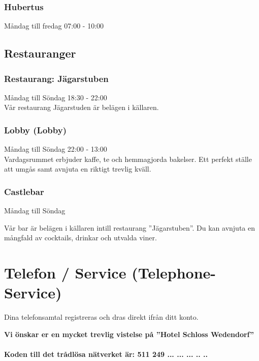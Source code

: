 \documentclass{report}
\begin{document}
\subsection{Hubertus}
Måndag till fredag 07:00 - 10:00

\section{Restauranger}
\subsection{Restaurang: Jägarstuben}
Måndag till Söndag 18:30 - 22:00 \\
Vår restaurang Jägarstuden är belägen i källaren.

\subsection{Lobby (Lobby)}
Måndag till Söndag 22:00 - 13:00 \\
Vardagsrummet erbjuder kaffe, te och hemmagjorda bakelser. Ett perfekt ställe
att umgås samt avnjuta en riktigt trevlig kväll.

\subsection{Castlebar}
Måndag till Söndag

Vår bar är belägen i källaren intill restaurang ''Jägarstuben''. Du kan avnjuta en mångfald av cocktails, drinkar och utvalda viner.

\chapter{Telefon / Service (Telephone-Service)}
Dina telefonsamtal registreras och dras direkt ifrån ditt konto.

\newpage

\bf{Vi önskar er en mycket trevlig vistelse på ''Hotel Schloss Wedendorf''}
\\\\
\huge{Koden till det trådlösa nätverket är: 511 249 ... ... ... .. ..}
\end{document}

